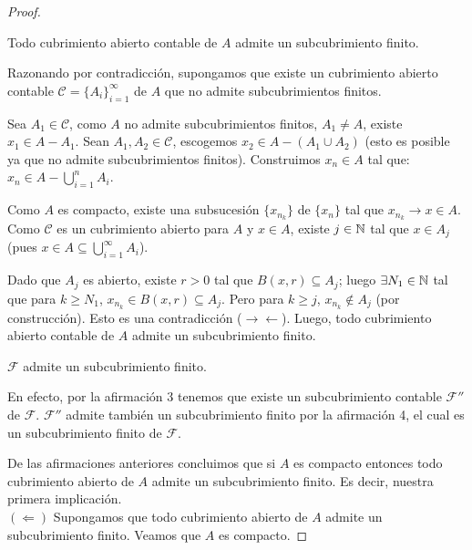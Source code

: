 \begin{proof}
    \begin{afirmacion}
        Todo cubrimiento abierto contable de $A$ admite un subcubrimiento finito.
    \end{afirmacion}
    
    \begin{prueba}
    Razonando por contradicción, supongamos que existe un cubrimiento abierto contable $\mathcal{C} = \{A_i\}_{i=1}^\infty$ de $A$ que no admite subcubrimientos finitos.
    
    Sea $A_1 \in \mathcal{C}$, como $A$ no admite subcubrimientos finitos, $A_1 \ne A$, existe $x_1 \in A - A_1$. Sean $A_1, A_2 \in \mathcal{C}$, escogemos $x_2 \in A - (A_1 \cup A_2)$ (esto es posible ya que no admite subcubrimientos finitos). Construimos $x_n \in A$ tal que: $x_n \in A - \bigcup_{i=1}^n A_i$.
    
    Como $A$ es compacto, existe una subsucesión $\{x_{n_k}\}$ de $\{x_n\}$ tal que $x_{n_k} \rightarrow x \in A$. Como $\mathcal{C}$ es un cubrimiento abierto para $A$ y $x \in A$, existe $j \in \mathbb{N}$ tal que $x \in A_j$ (pues $x \in A \subseteq \bigcup_{i=1}^\infty A_i$).
    
    Dado que $A_j$ es abierto, existe $r > 0$ tal que $B(x, r) \subseteq A_j$; luego $\exists N_1 \in \mathbb{N}$ tal que para $k \ge N_1$, $x_{n_k} \in B(x, r) \subseteq A_j$. Pero para $k \ge j$, $x_{n_k} \notin A_j$ (por construcción). Esto es una contradicción ($\rightarrow\leftarrow$). Luego, todo cubrimiento abierto contable de $A$ admite un subcubrimiento finito.
    \end{prueba}

    \begin{afirmacion}
        $\mathcal{F}$ admite un subcubrimiento finito.
    \end{afirmacion}
    
    \begin{prueba}
    En efecto, por la afirmación 3 tenemos que existe un subcubrimiento contable $\mathcal{F}''$ de $\mathcal{F}$. $\mathcal{F}''$ admite también un subcubrimiento finito por la afirmación 4, el cual es un subcubrimiento finito de $\mathcal{F}$. 
    \end{prueba}
    De las afirmaciones anteriores concluimos que si $A$ es compacto entonces todo cubrimiento abierto de $A$ admite un subcubrimiento finito. Es decir, nuestra primera implicación.\\

    $(\Leftarrow)$ Supongamos que todo cubrimiento abierto de $A$ admite un subcubrimiento finito. Veamos que $A$ es compacto.
    

\end{proof}
